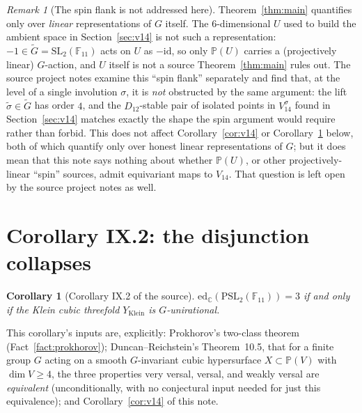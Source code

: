 \documentclass[11pt]{article}
\theoremstyle{plain}
\newtheorem{corollary}[theorem]{Corollary}
\theoremstyle{definition}
\theoremstyle{remark}
\newtheorem{remark}[theorem]{Remark}
\newcommand{\PSL}{\mathrm{PSL}_2(\mathbb{F}_{11})}
\newcommand{\SLg}{\mathrm{SL}_2(\mathbb{F}_{11})}
\newcommand{\edC}{\mathrm{ed}_{\mathbb C}}
\newcommand{\PP}{\mathbb P}
\begin{document}
\begin{remark}[The spin flank is not addressed here]
\label{rem:spin}
Theorem~\ref{thm:main} quantifies only over \emph{linear} representations
of $G$ itself. The $6$-dimensional $U$ used to build the ambient space
in Section~\ref{sec:v14} is not such a representation: $-1\in\widetilde
G=\SLg$ acts on $U$ as $-\mathrm{id}$, so only $\PP(U)$ carries a
(projectively linear) $G$-action, and $U$ itself is not a source
Theorem~\ref{thm:main} rules out. The source project notes examine this
``spin flank'' separately and find that, at the level of a single
involution $\sigma$, it is \emph{not} obstructed by the same argument:
the lift $\widetilde\sigma\in\widetilde G$ has order $4$, and the
$D_{12}$-stable pair of isolated points in $V_{14}^\sigma$ found in
Section~\ref{sec:v14} matches exactly the shape the spin argument would
require rather than forbid. This does not affect
Corollary~\ref{cor:v14} or Corollary~\ref{cor:ix2} below, both of which
quantify only over honest linear representations of $G$; but it does
mean that this note says nothing about whether $\PP(U)$, or other
projectively-linear ``spin'' sources, admit equivariant maps to
$V_{14}$. That question is left open by the source project notes as
well.
\end{remark}

\section{Corollary IX.2: the disjunction collapses}
\label{sec:ix2}

\begin{corollary}[{Corollary IX.2 of the source}]
\label{cor:ix2}
$\edC(\PSL)=3$ if and only if the Klein cubic threefold $Y_{\mathrm
{Klein}}$ is $G$-unirational.
\end{corollary}

This corollary's inputs are, explicitly: Prokhorov's two-class theorem
(Fact~\ref{fact:prokhorov}); Duncan--Reichstein's Theorem~10.5, that for
a finite group $G$ acting on a smooth $G$-invariant cubic hypersurface
$X\subset\PP(V)$ with $\dim V\ge 4$, the three properties very versal,
versal, and weakly versal are \emph{equivalent} (unconditionally, with
no conjectural input needed for just this equivalence); and
Corollary~\ref{cor:v14} of this note.
\end{document}
